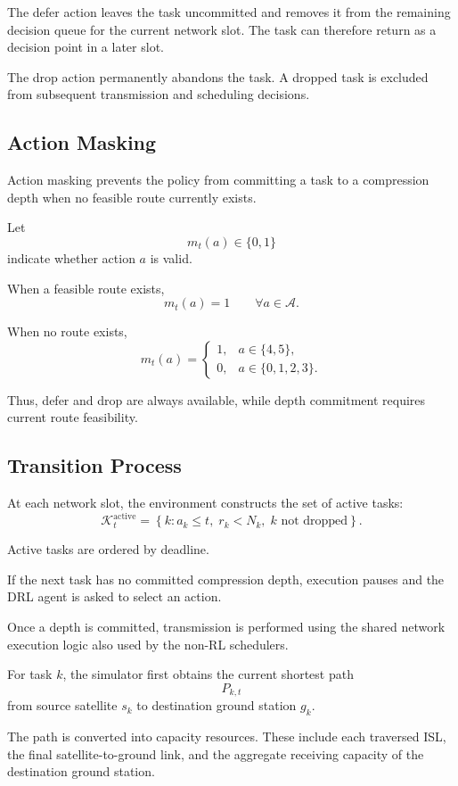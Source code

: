 \documentclass[11pt]{article}
\begin{document}
The defer action leaves the task uncommitted and removes it from the
remaining decision queue for the current network slot. The task can therefore
return as a decision point in a later slot.

The drop action permanently abandons the task. A dropped task is excluded
from subsequent transmission and scheduling decisions.


\subsection{Action Masking}

Action masking prevents the policy from committing a task to a compression
depth when no feasible route currently exists.

Let
\[
m_t(a)\in\{0,1\}
\]
indicate whether action $a$ is valid.

When a feasible route exists,
\[
m_t(a)=1
\qquad
\forall a\in\mathcal{A}.
\]

When no route exists,
\[
m_t(a)
=
\begin{cases}
1, & a\in\{4,5\},\\
0, & a\in\{0,1,2,3\}.
\end{cases}
\]

Thus, defer and drop are always available, while depth commitment requires
current route feasibility.


\subsection{Transition Process}

At each network slot, the environment constructs the set of active tasks:
\[
\mathcal{K}^{\mathrm{active}}_t
=
\left\{
k:
a_k\le t,\;
r_k<N_k,\;
k\text{ not dropped}
\right\}.
\]

Active tasks are ordered by deadline.

If the next task has no committed compression depth, execution pauses and the
DRL agent is asked to select an action.

Once a depth is committed, transmission is performed using the shared network
execution logic also used by the non-RL schedulers.

For task $k$, the simulator first obtains the current shortest path
\[
P_{k,t}
\]
from source satellite $s_k$ to destination ground station $g_k$.

The path is converted into capacity resources. These include each traversed
ISL, the final satellite-to-ground link, and the aggregate receiving capacity
of the destination ground station.
\end{document}
